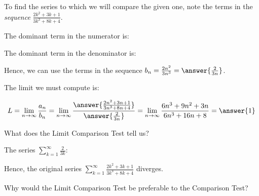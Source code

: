 \documentclass{ximera}
\begin{document}
\begin{exercise}
\begin{exercise}
To find the series to which we will compare the given one, note the terms in the \emph{sequence} $\frac{2k^2+3k+1}{3k^3+8k+4}$.   

The dominant term in the numerator is:
\begin{multipleChoice}
\end{multipleChoice}

The dominant term in the denominator is:
\begin{multipleChoice}
\end{multipleChoice}

Hence, we can use the terms in the sequence $b_n = \frac{2n^2}{3n^3} = \answer{\frac{2}{3n}}$.  

\begin{exercise}
The limit we must compute is:

\[
L = \lim_{n \to \infty} \frac{a_n}{b_n} =  \lim_{n \to \infty} \frac{\answer{\frac{2n^2+3n+1}{3n^3+8n+4}}}{\answer{\frac{2}{3n}}}  =  \lim_{n \to \infty} \frac{6n^3+9n^2+3n}{6n^3+16n+8} = \answer{1}
\]

What does the Limit Comparison Test tell us?
\begin{multipleChoice}
\end{multipleChoice}

The series $\sum_{k=1}^{\infty} \frac{2}{3k}$:
\begin{multipleChoice}
\end{multipleChoice}

Hence, the original series $\sum_{k=1}^{\infty} \frac{2k^2+3k+1}{3k^3+8k+4}$ diverges.

\begin{exercise}
Why would the Limit Comparison Test be preferable to the Comparison Test?
\begin{multipleChoice}
\end{multipleChoice}

\end{exercise}
\end{exercise}
\end{exercise}
\end{exercise}
\end{document}
